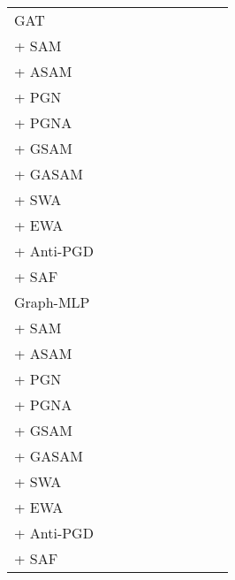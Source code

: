 \documentclass[runningheads]{llncs}
\newcommand{\GraphMLP}{Graph-MLP\xspace}
\newcommand\good[1]{\textcolor{forestgreen}{#1}}
\newcommand\bad[1]{\textcolor{red}{#1}}
\begin{document}
\begin{table*}[!ht]
{\begin{tabular}{l|r r | r r | r r | r | r | r }
  GAT &  &  &  &  &  &  &  &  & \\
 + SAM & \bad{} & \good{} & \bad{} & \bad{} & \good{} & \good{} & \good{} & \good{} & \good{}\\
 + ASAM & \bad{} & \good{} & \bad{} & \bad{} & \bad{} & \bad{} & \good{} & \good{} & \good{}\\
 + PGN & \good{} & \good{} & \good{} & \good{} & \bad{} & \good{} & \good{} & \good{} & \good{}\\
 + PGNA & \bad{} & \good{} & \good{} & \good{} & \bad{} & \bad{} & \good{} & \good{} & \good{}\\
 + GSAM & \bad{} & \good{} & \bad{} & \bad{} & \good{} & \good{} & \good{} & \good{} & \good{}\\
 + GASAM & \bad{} & \good{} & \bad{} & \good{} & \bad{} & \bad{} & \good{} & \good{} & \good{}\\ \hline
 + SWA & \bad{} & \good{} & \good{} & \good{} & \bad{} & \good{} & \good{} & \good{} & \bad{}\\
 + EWA & \bad{} & \good{} & \good{} & \good{} & \bad{} & \good{} & \good{} & \good{} & \good{}\\ \hline
 + Anti-PGD & \good{} & \bad{} & \good{} & \good{} & \bad{} & \good{} & \good{} & \good{} & \good{}\\
 + SAF & \good{} & \good{} & \good{} & \good{} & \good{} & \good{} & \good{} & \good{} & \bad{} \\

\hline
\midrule

  \GraphMLP &  &  &  &  &  &  &  &  & \\ \hline
 + SAM & \good{} & \good{} & \bad{} & \good{} & \bad{} & \good{} & \good{} & \good{} & \bad{}\\
 + ASAM & \good{} & \bad{} & \bad{} & \bad{} & \bad{} & \bad{} & \bad{} & \good{} & \bad{}\\
 + PGN & \good{} & \good{} & \bad{} & \good{} & \good{} & \good{} & \good{} & \good{} & \good{}\\
 + PGNA & \good{} & \bad{} & \bad{} & \bad{} & \bad{} & \good{} & \good{} & \good{} & \good{}\\
 + GSAM & \good{} & \good{} & \bad{} & \good{} & \bad{} & \good{} & \good{} & \good{} & \bad{}\\
 + GASAM & \good{} & \good{} & \bad{} & \good{} & \good{} & \bad{} & \bad{} & \good{} & \bad{}\\ \hline
 + SWA & \bad{} & \good{} & \bad{} & \good{} & \bad{} & \bad{} & \good{} & \good{} & \bad{}\\
 + EWA & \bad{} & \good{} & \bad{} & \good{} & \bad{} & \good{} & \good{} & \good{} & \bad{}\\ \hline
 + Anti-PGD & \good{} & \bad{} & \bad{} & \good{} & \good{} & \good{} & \good{} & \good{} & \good{}\\
 + SAF & \good{} & \good{} & \good{} & \good{} & \good{} & \good{} & \good{} & \good{} & \good{}\\

   \bottomrule
    \end{tabular}}
\end{table*}
\end{document}

